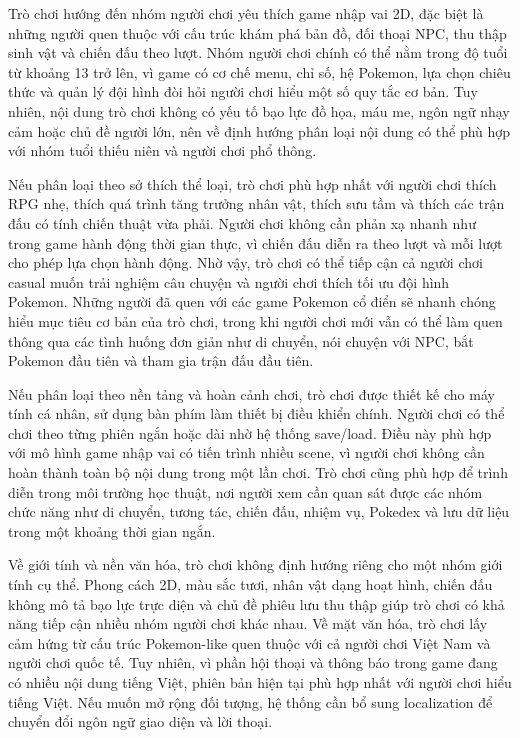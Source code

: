 Trò chơi hướng đến nhóm người chơi yêu thích game nhập vai 2D, đặc biệt là những người quen thuộc với cấu trúc khám phá bản đồ, đối thoại NPC, thu thập sinh vật và chiến đấu theo lượt. Nhóm người chơi chính có thể nằm trong độ tuổi từ khoảng 13 trở lên, vì game có cơ chế menu, chỉ số, hệ Pokemon, lựa chọn chiêu thức và quản lý đội hình đòi hỏi người chơi hiểu một số quy tắc cơ bản. Tuy nhiên, nội dung trò chơi không có yếu tố bạo lực đồ họa, máu me, ngôn ngữ nhạy cảm hoặc chủ đề người lớn, nên về định hướng phân loại nội dung có thể phù hợp với nhóm tuổi thiếu niên và người chơi phổ thông.

Nếu phân loại theo sở thích thể loại, trò chơi phù hợp nhất với người chơi thích RPG nhẹ, thích quá trình tăng trưởng nhân vật, thích sưu tầm và thích các trận đấu có tính chiến thuật vừa phải. Người chơi không cần phản xạ nhanh như trong game hành động thời gian thực, vì chiến đấu diễn ra theo lượt và mỗi lượt cho phép lựa chọn hành động. Nhờ vậy, trò chơi có thể tiếp cận cả người chơi casual muốn trải nghiệm câu chuyện và người chơi thích tối ưu đội hình Pokemon. Những người đã quen với các game Pokemon cổ điển sẽ nhanh chóng hiểu mục tiêu cơ bản của trò chơi, trong khi người chơi mới vẫn có thể làm quen thông qua các tình huống đơn giản như di chuyển, nói chuyện với NPC, bắt Pokemon đầu tiên và tham gia trận đấu đầu tiên.

Nếu phân loại theo nền tảng và hoàn cảnh chơi, trò chơi được thiết kế cho máy tính cá nhân, sử dụng bàn phím làm thiết bị điều khiển chính. Người chơi có thể chơi theo từng phiên ngắn hoặc dài nhờ hệ thống save/load. Điều này phù hợp với mô hình game nhập vai có tiến trình nhiều scene, vì người chơi không cần hoàn thành toàn bộ nội dung trong một lần chơi. Trò chơi cũng phù hợp để trình diễn trong môi trường học thuật, nơi người xem cần quan sát được các nhóm chức năng như di chuyển, tương tác, chiến đấu, nhiệm vụ, Pokedex và lưu dữ liệu trong một khoảng thời gian ngắn.

Về giới tính và nền văn hóa, trò chơi không định hướng riêng cho một nhóm giới tính cụ thể. Phong cách 2D, màu sắc tươi, nhân vật dạng hoạt hình, chiến đấu không mô tả bạo lực trực diện và chủ đề phiêu lưu thu thập giúp trò chơi có khả năng tiếp cận nhiều nhóm người chơi khác nhau. Về mặt văn hóa, trò chơi lấy cảm hứng từ cấu trúc Pokemon-like quen thuộc với cả người chơi Việt Nam và người chơi quốc tế. Tuy nhiên, vì phần hội thoại và thông báo trong game đang có nhiều nội dung tiếng Việt, phiên bản hiện tại phù hợp nhất với người chơi hiểu tiếng Việt. Nếu muốn mở rộng đối tượng, hệ thống cần bổ sung localization để chuyển đổi ngôn ngữ giao diện và lời thoại.

